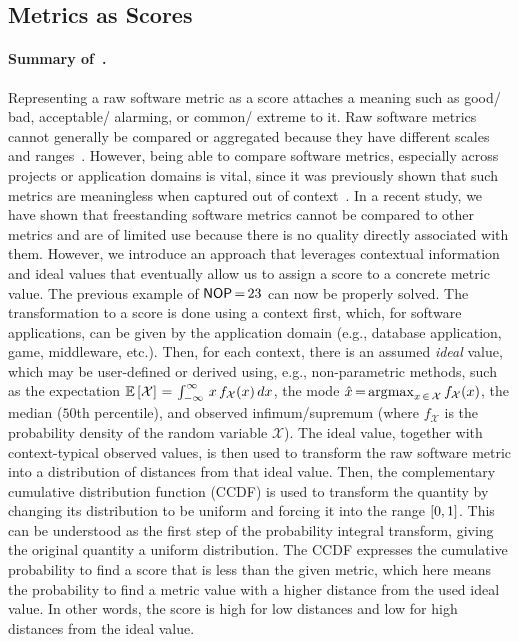 \subsection{Metrics as Scores}\label{ssec:summary-honel2022qrsmas}
%
\paragraph{Summary of~.}
Representing a raw software metric as a score attaches a meaning such as good/\allowbreak
bad, acceptable/\allowbreak
alarming, or common/\allowbreak
extreme to it.
Raw software metrics cannot generally be compared or aggregated because they have different scales and ranges~\cite{ulan2018qms}.
However, being able to compare software metrics, especially across projects or application domains is vital, since it was previously shown that such metrics are meaningless when captured out of context~\cite{gil2016meannothing}.
In a recent study, we have shown that freestanding software metrics cannot be compared to other metrics and are of limited use because there is no quality directly associated with them.
However, we introduce an approach that leverages contextual information and ideal values that eventually allow us to assign a score to a concrete metric value.
The previous example of $\mathsf{NOP}\,{=}\,23$ can now be properly solved.
The transformation to a score is done using a context first, which, for software applications, can be given by the application domain (e.g., database application, game, middleware, etc.).
Then, for each context, there is an assumed \emph{ideal} value, which may be user-defined or derived using, e.g., non-parametric methods, such as the expectation $\mathbb{E}\left[\mathcal{X}\right]\,{=}\,\int_{-\infty}^{\infty}\,x\,f_{\mathcal{X}}(x)\,dx$, the mode $\hat{x}\,{=}\,\mathrm{arg\,\!max}_{x\,{\in}\,\mathcal{X}}\,f_{\mathcal{X}}(x)$, the median ($50$th percentile), and observed infimum/supremum (where $f_{\mathcal{X}}$ is the probability density of the random variable $\mathcal{X}$).
The ideal value, together with context-typical observed values, is then used to transform the raw software metric into a distribution of distances from that ideal value.
Then, the complementary cumulative distribution function (CCDF) is used to transform the quantity by changing its distribution to be uniform and forcing it into the range $\interval{0}{1}$.
This can be understood as the first step of the probability integral transform, giving the original quantity a uniform distribution.
The CCDF expresses the cumulative probability to find a score that is less than the given metric, which here means the probability to find a metric value with a higher distance from the used ideal value.
In other words, the score is high for low distances and low for high distances from the ideal value.


